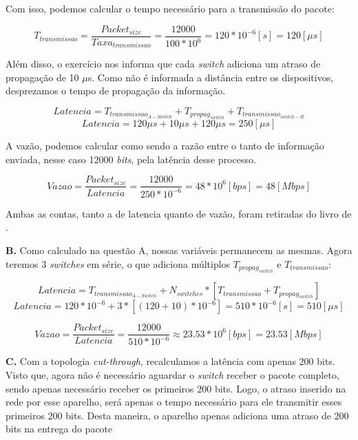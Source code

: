 Com isso, podemos calcular o tempo necessário para a transmissão do pacote:

\begin{equation}
	T_{transmissao} = \frac{Packet_{size}}{Taxa_{transmissao}} = \frac{12000}{100 * 10^6} = 120*10^{-6} [s] = 120 [\mu s]	
\end{equation}	

Além disso, o exercício nos informa que cada \textit{switch} adiciona um atraso de propagação de 10 $\mu$s. Como não é informada a distância entre os dispositivos, desprezamos o tempo de propagação da informação.

\begin{equation}
	Latencia = T_{transmissao_{A-Switch}} + T_{propag_{switch}} + T_{transmissao_{switch-B}}
\end{equation} 
\begin{equation}
	Latencia = 120\mu s + 10\mu s + 120\mu s = 250 [\mu s]
\end{equation}

A vazão, podemos calcular como sendo a razão entre o tanto de informação enviada, nesse caso 12000 \textit{bits}, pela latência desse processo.

\begin{equation}
	Vazao = \frac{Packet_{size}}{Latencia} = \frac{12000}{250 * 10^{-6}} = 48 * 10^6 [bps] = 48 [Mbps]
\end{equation}

Ambas as contas, tanto a de latencia quanto de vazão, foram retiradas do livro de \textcite{peterson2025redes}.

\textbf{B. } Como calculado na questão A, nossas variáveis permanecem as mesmas. Agora teremos 3 \textit{switches} em série, o que adiciona múltiplos $T_{propag_{switch}}$ e $T_{transmissao}$:

\begin{equation}
	Latencia = T_{transmissao_{A-Switch}} + N_{switches}*[T_{transmissao} + T_{propag_{switch}}]
\end{equation}
\begin{equation}
	Latencia = 120*10^{-6} + 3*[(120 + 10)*10^{-6}] = 510 * 10^{-6} [s] = 510 [\mu s] 
\end{equation}

\begin{equation}
	Vazao = \frac{Packet_{size}}{Latencia} = \frac{12000}{510 * 10^{-6}} \approx 23.53 * 10^6 [bps] = 23.53 [Mbps]
\end{equation}

\textbf{C. } Com a topologia \textit{cut-through}, recalculamos a latência com apenas 200 bits. Visto que, agora não é necessário aguardar o \textit{switch} receber o pacote completo, sendo apenas necessário receber os primeiros 200 bits. Logo, o atraso inserido na rede por esse aparelho, será apenas o tempo necessário para ele transmitir esses primeiros 200 bits. Desta maneira, o aparelho apenas adiciona uma atraso de 200 bits na entrega do pacote

